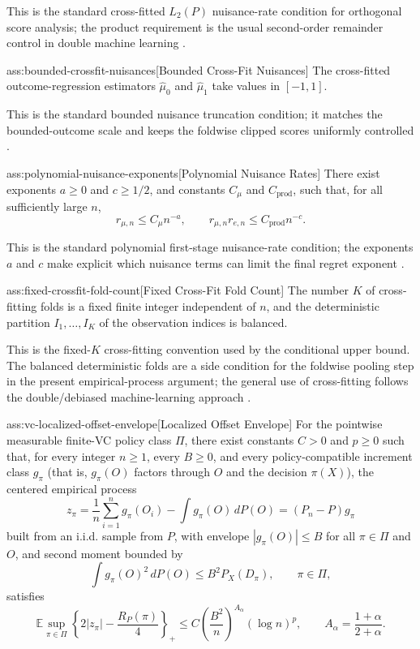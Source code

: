 \documentclass[11pt]{article}
\begin{document}
This is the standard cross-fitted \(L_2(P)\) nuisance-rate condition for orthogonal score analysis; the product requirement is the usual second-order remainder control in double machine learning \citep{Chernozhukov2018}.

\begin{assumptionv}{ass:bounded-crossfit-nuisances}[Bounded Cross-Fit Nuisances]
The cross-fitted outcome-regression estimators \(\widehat\mu_0\) and \(\widehat\mu_1\) take values in \([-1,1]\).
\end{assumptionv}

This is the standard bounded nuisance truncation condition; it matches the bounded-outcome scale and keeps the foldwise clipped scores uniformly controlled \citep{Chernozhukov2018}.

\begin{assumptionv}{ass:polynomial-nuisance-exponents}[Polynomial Nuisance Rates]
There exist exponents \(a\ge 0\) and \(c\ge 1/2\), and constants \(C_\mu\) and \(C_{\mathrm{prod}}\), such that, for all sufficiently large \(n\),
\[
r_{\mu,n}\le C_\mu n^{-a},
\qquad
r_{\mu,n}r_{e,n}\le C_{\mathrm{prod}}n^{-c}.
\]
\end{assumptionv}

This is the standard polynomial first-stage nuisance-rate condition; the exponents \(a\) and \(c\) make explicit which nuisance terms can limit the final regret exponent \citep{Chernozhukov2018}.

\begin{assumptionv}{ass:fixed-crossfit-fold-count}[Fixed Cross-Fit Fold Count]
The number \(K\) of cross-fitting folds is a fixed finite integer independent of \(n\), and the deterministic partition \(I_1,\ldots,I_K\) of the observation indices is balanced.
\end{assumptionv}

This is the fixed-\(K\) cross-fitting convention used by the conditional upper bound.  The balanced deterministic folds are a side condition for the foldwise pooling step in the present empirical-process argument; the general use of cross-fitting follows the double/debiased machine-learning approach \citep{Chernozhukov2018}.

\begin{assumptionv}{ass:vc-localized-offset-envelope}[Localized Offset Envelope]
For the pointwise measurable finite-VC policy class \(\Pi\), there exist constants \(C>0\) and \(p\ge0\) such that, for every integer \(n\ge1\), every \(B\ge0\), and every policy-compatible increment class \(g_\pi\) (that is, \(g_\pi(O)\) factors through \(O\) and the decision \(\pi(X)\)), the centered empirical process
\[
z_\pi=\frac1n\sum_{i=1}^n g_\pi(O_i)-\int g_\pi(O)\,dP(O)
=(P_n-P)g_\pi
\]
built from an i.i.d. sample from \(P\), with envelope \(|g_\pi(O)|\le B\) for all \(\pi\in\Pi\) and \(O\), and second moment bounded by
\[
\int g_\pi(O)^2\,dP(O)\le B^2 P_X(D_\pi),
\qquad \pi\in\Pi,
\]
satisfies
\[
\mathbb E\sup_{\pi\in\Pi}
\left\{2|z_\pi|-\frac{R_P(\pi)}{4}\right\}_+
\le
C\left(\frac{B^2}{n}\right)^{A_\alpha}(\log n)^p,
\qquad A_\alpha=\frac{1+\alpha}{2+\alpha}.
\]
\end{assumptionv}
\end{document}
